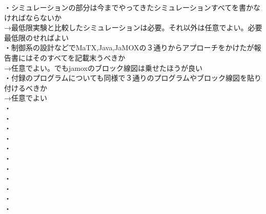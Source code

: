 ・シミュレーションの部分は今までやってきたシミュレーションすべてを書かなければならないか\\
→最低限実験と比較したシミュレーションは必要。それ以外は任意でよい。必要最低限のせればよい\\
・制御系の設計などでMaTX,Java,JaMOXの３通りからアプローチをかけたが報告書にはそのすべてを記載末うべきか\\
→任意でよい。でもjamoxのブロック線図は乗せたほうが良い\\
・付録のプログラムについても同様で３通りのプログラムやブロック線図を貼り付けるべきか\\
→任意でよい\\
・\\
・\\
・\\
・\\
・\\
・\\
・\\
・\\
・\\
・\\
・\\

